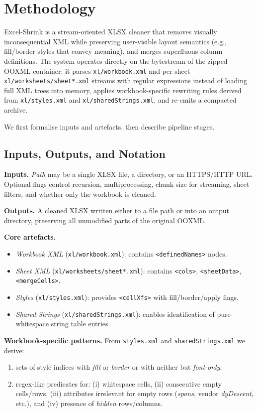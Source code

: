 \section{Methodology}

\noindent Excel-Shrink is a stream-oriented XLSX cleaner that removes visually inconsequential XML
while preserving user-visible layout semantics
(e.g., fill/border styles that convey meaning),
and merges superfluous column definitions.
The system operates directly on the bytestream of the zipped OOXML container:
it parses \texttt{xl/workbook.xml}
and per-sheet \texttt{xl/worksheets/sheet*.xml} streams with regular expressions
instead of loading full XML trees into memory,
applies workbook-specific rewriting rules
derived from \texttt{xl/styles.xml} and \texttt{xl/sharedStrings.xml},
and re-emits a compacted archive.

We first formalise inputs and artefacts, then describe pipeline stages.

\subsection{Inputs, Outputs, and Notation}

\textbf{Inputs.}
\emph{Path} may be a single XLSX file, a directory, or an HTTPS/HTTP URL. Optional flags control recursion, multiprocessing, chunk size for streaming, sheet filters, and whether only the workbook is cleaned.

\textbf{Outputs.}
A cleaned XLSX written either to a file path or into an output directory, preserving all unmodified parts of the original OOXML.

\textbf{Core artefacts.}
\begin{itemize}
\item \emph{Workbook XML} (\texttt{xl/workbook.xml}): contains \texttt{<definedNames>} nodes.
\item \emph{Sheet XML} (\texttt{xl/worksheets/sheet*.xml}): contains \texttt{<cols>}, \texttt{<sheetData>}, \texttt{<mergeCells>}.
\item \emph{Styles} (\texttt{xl/styles.xml}): provides \texttt{<cellXfs>} with fill/border/apply flags.
\item \emph{Shared Strings} (\texttt{xl/sharedStrings.xml}): enables identification of pure-whitespace string table entries.
\end{itemize}

\noindent \textbf{Workbook-specific patterns.}
From \texttt{styles.xml} and \texttt{sharedStrings.xml} we derive:
\begin{enumerate}
\item sets of style indices with \emph{fill} or \emph{border} or with neither but \emph{font-only};
\item regex-like predicates for: (i) whitespace cells, (ii) consecutive empty cells/rows, (iii) attributes irrelevant for empty rows (\emph{spans}, vendor \emph{dyDescent}, etc.), and (iv) presence of \emph{hidden} rows/columns.
\end{enumerate}






